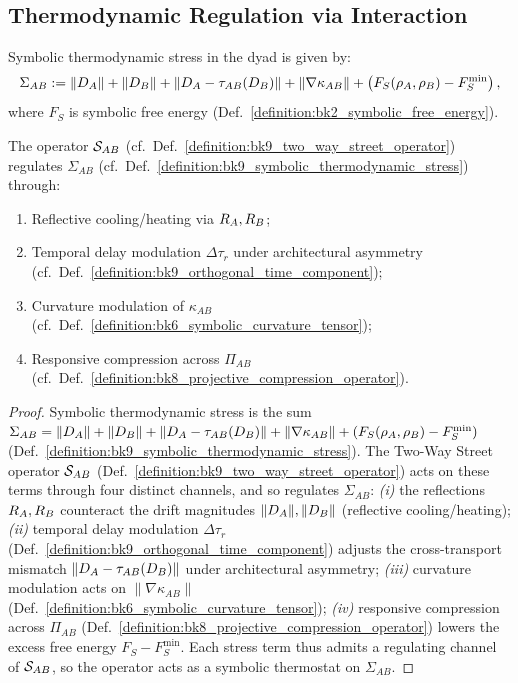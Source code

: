 \subsection{Thermodynamic Regulation via Interaction}
\label{subsec:bk9_thermodynamic_regulation_via_interaction}
\begin{definition}
\label{definition:bk9_symbolic_thermodynamic_stress}
Symbolic thermodynamic stress in the dyad is given by:
\[
\Sigma_{AB} := \|D_A\| + \|D_B\| + \|D_A - \tau_{AB}(D_B)\| + \|\nabla \kappa_{AB}\| + \left(F_S(\rho_A, \rho_B) - F_S^\text{min}\right),
\]
where \( F_S \) is symbolic free energy (Def.~\ref{definition:bk2_symbolic_free_energy}).
\end{definition}
\begin{theorem}
\label{theorem:bk9_symbolic_thermostat}
The operator \( \mathcal{S}_{AB} \) (cf.~Def.~\ref{definition:bk9_two_way_street_operator}) regulates \( \Sigma_{AB} \) (cf.~Def.~\ref{definition:bk9_symbolic_thermodynamic_stress}) through:
\begin{enumerate}[label=(\roman*)]
    \item Reflective cooling/heating via \( R_A, R_B \);
    \item Temporal delay modulation \( \Delta \tau_r \) under architectural asymmetry (cf.~Def.~\ref{definition:bk9_orthogonal_time_component});
    \item Curvature modulation of \( \kappa_{AB} \) (cf.~Def.~\ref{definition:bk6_symbolic_curvature_tensor});
    \item Responsive compression across \( \Pi_{AB} \) (cf.~Def.~\ref{definition:bk8_projective_compression_operator}).
\end{enumerate}
\end{theorem}
\begin{proof}
\label{proof:bk9_symbolic_thermostat}
\leavevmode
Symbolic thermodynamic stress is the sum $\Sigma_{AB}=\|D_A\|+\|D_B\|+\|D_A-\tau_{AB}(D_B)\|+\|\nabla\kappa_{AB}\|+(F_S(\rho_A,\rho_B)-F_S^{\text{min}})$ (Def.~\ref{definition:bk9_symbolic_thermodynamic_stress}). The Two-Way Street operator $\mathcal{S}_{AB}$ (Def.~\ref{definition:bk9_two_way_street_operator}) acts on these terms through four distinct channels, and so regulates $\Sigma_{AB}$: \emph{(i)} the reflections $R_A,R_B$ counteract the drift magnitudes $\|D_A\|,\|D_B\|$ (reflective cooling/heating); \emph{(ii)} temporal delay modulation $\Delta\tau_r$ (Def.~\ref{definition:bk9_orthogonal_time_component}) adjusts the cross-transport mismatch $\|D_A-\tau_{AB}(D_B)\|$ under architectural asymmetry; \emph{(iii)} curvature modulation acts on $\|\nabla\kappa_{AB}\|$ (Def.~\ref{definition:bk6_symbolic_curvature_tensor}); \emph{(iv)} responsive compression across $\Pi_{AB}$ (Def.~\ref{definition:bk8_projective_compression_operator}) lowers the excess free energy $F_S-F_S^{\text{min}}$. Each stress term thus admits a regulating channel of $\mathcal{S}_{AB}$, so the operator acts as a symbolic thermostat on $\Sigma_{AB}$.
\end{proof}
